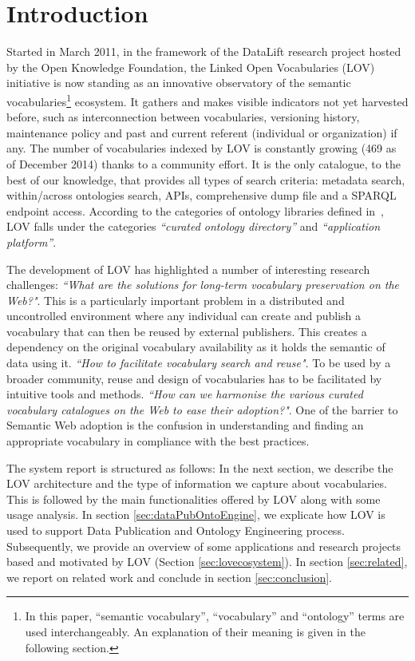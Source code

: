 \documentclass{iosart2c}
\begin{document}
\section{Introduction}
Started in March 2011, in the framework of the DataLift research project \cite{scharffe_2012} hosted by the Open Knowledge Foundation, the Linked Open Vocabularies (LOV) initiative is now standing as an innovative observatory of the semantic vocabularies\footnote{In this paper, ``semantic vocabulary'', ``vocabulary'' and ``ontology'' terms are used interchangeably. An explanation of their meaning is given in the following section.} ecosystem. It gathers and makes visible indicators not yet harvested before, such as interconnection between vocabularies, versioning history, maintenance policy and past and current referent (individual or organization) if any. The number of vocabularies indexed by LOV is constantly growing (469 as of December 2014) thanks to a community effort. It is the only catalogue, to the best of our knowledge, that provides all types of search criteria: metadata search, within/across ontologies search, APIs, comprehensive dump file and a SPARQL endpoint access. According to the categories of ontology libraries defined in~\cite{AquinJoWS12}, LOV falls under the categories \textit{``curated ontology directory''}  and \textit{``application platform''}.

The development of LOV has highlighted a number of interesting research challenges: \textit{``What are the solutions for long-term vocabulary preservation on the Web?"}\cite{Baker2013HLT}. This is a particularly important problem in a distributed and uncontrolled environment where any individual can create and publish a vocabulary that can then be reused by external publishers. This creates a dependency on the original vocabulary availability as it holds the semantic of data using it. \textit{``How to facilitate vocabulary search and reuse"}\cite{butt2014, poveda2012landscape}. To be used by a broader community, reuse and design of vocabularies has to be facilitated by intuitive tools and methods.  \textit{``How can we harmonise the various curated vocabulary catalogues on the Web to ease their adoption?"}\cite{wasabi13}. One of the barrier to Semantic Web adoption is the confusion in understanding and finding an appropriate vocabulary in compliance with the best practices.

The system report is structured as follows: In the next section, we describe the LOV architecture and the type of information we capture about vocabularies. This is followed by the main functionalities offered by LOV along with some usage analysis. In section \ref{sec:dataPubOntoEngine}, we explicate how LOV is used to support Data Publication and Ontology Engineering process. Subsequently, we provide an overview of some applications and research projects based and motivated by LOV (Section \ref{sec:lovecosystem}). In section \ref{sec:related}, we report on related work and conclude in section \ref{sec:conclusion}.
\end{document}
